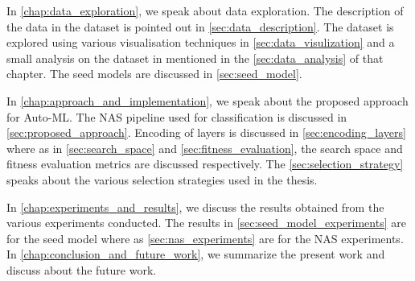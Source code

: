 In \autoref{chap:data_exploration}, we speak about data exploration. The description of the data in the dataset is pointed out in \autoref{sec:data_description}. The dataset is explored using various visualisation techniques in \autoref{sec:data_visulization} and a small analysis on the dataset in mentioned in the \autoref{sec:data_analysis} of that chapter. The seed models are discussed in \autoref{sec:seed_model}.

In \autoref{chap:approach_and_implementation}, we speak about the proposed approach for Auto-ML. The NAS pipeline used for classification is discussed in \autoref{sec:proposed_approach}. Encoding of layers is discussed in \autoref{sec:encoding_layers} where as in \autoref{sec:search_space} and \autoref{sec:fitness_evaluation}, the search space and fitness evaluation metrics are discussed respectively. The \autoref{sec:selection_strategy} speaks about the various selection strategies used in the thesis.

In \autoref{chap:experiments_and_results}, we discuss the results obtained from the various experiments conducted. The results in \autoref{sec:seed_model_experiments} are for the seed model where as \autoref{sec:nas_experiments} are for the NAS experiments. In \autoref{chap:conclusion_and_future_work}, we summarize the present work and discuss about the future work.

\afterpage{\blankpage}